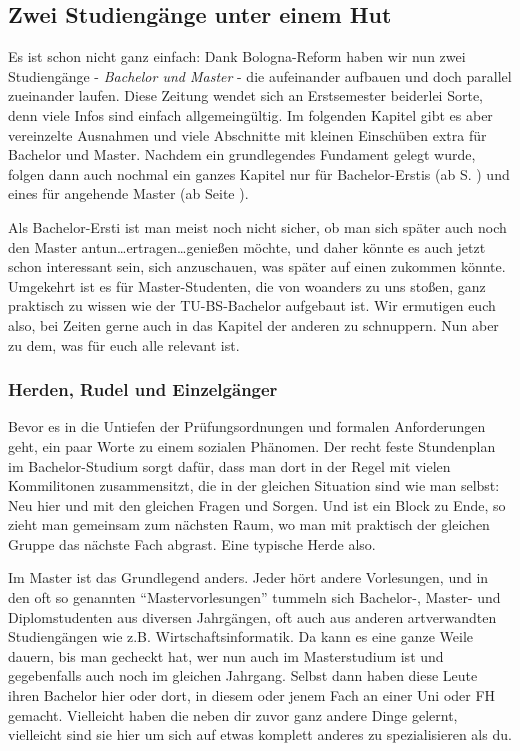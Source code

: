 \subsection{Zwei Studiengänge unter einem Hut}
Es ist schon nicht ganz einfach: Dank Bologna-Reform haben wir nun zwei Studiengänge - \textit{Bachelor und Master} - die aufeinander aufbauen und doch parallel zueinander laufen. Diese Zeitung wendet sich an Erstsemester beiderlei Sorte, denn viele Infos sind einfach allgemeingültig. Im folgenden Kapitel gibt es aber vereinzelte Ausnahmen und viele Abschnitte mit kleinen Einschüben extra für Bachelor und Master. Nachdem ein grundlegendes Fundament gelegt wurde, folgen dann auch nochmal ein ganzes Kapitel nur für Bachelor-Erstis (ab S. \pageref{bachelor}) und eines für angehende Master (ab Seite \pageref{master}).

Als Bachelor-Ersti ist man meist noch nicht sicher, ob man sich später auch noch den Master antun\ldots ertragen\ldots genießen möchte, und daher könnte es auch jetzt schon interessant sein, sich anzuschauen, was später auf einen zukommen könnte. Umgekehrt ist es für Master-Studenten, die von woanders zu uns stoßen, ganz praktisch zu wissen wie der TU-BS-Bachelor aufgebaut ist. Wir ermutigen euch also, bei Zeiten gerne auch in das Kapitel der anderen zu schnuppern. Nun aber zu dem, was für euch alle relevant ist.

\subsubsection{Herden, Rudel und Einzelgänger}
Bevor es in die Untiefen der Prüfungsordnungen und formalen Anforderungen geht, ein paar Worte zu einem sozialen Phänomen. Der recht feste Stundenplan im Bachelor-Studium sorgt dafür, dass man dort in der Regel mit vielen Kommilitonen zusammensitzt, die in der gleichen Situation sind wie man selbst: Neu hier und mit den gleichen Fragen und Sorgen. Und ist ein Block zu Ende, so zieht man gemeinsam zum nächsten Raum, wo man mit praktisch der gleichen Gruppe das nächste Fach abgrast. Eine typische Herde also.

Im Master ist das Grundlegend anders. Jeder hört andere Vorlesungen,
und in den oft so genannten "`Mastervorlesungen"' tummeln sich
Bachelor-, Master- und Diplomstudenten aus diversen Jahrgängen, oft
auch aus anderen artverwandten Studiengängen wie
z.B. Wirtschaftsinformatik. Da kann es eine ganze Weile dauern, bis
man gecheckt hat, wer nun auch im Masterstudium ist und gegebenfalls auch noch im gleichen Jahrgang. Selbst dann haben diese Leute ihren Bachelor hier oder dort, in diesem oder jenem Fach an einer Uni oder FH gemacht. Vielleicht haben die neben dir zuvor ganz andere Dinge gelernt, vielleicht sind sie hier um sich auf etwas komplett anderes zu spezialisieren als du.

